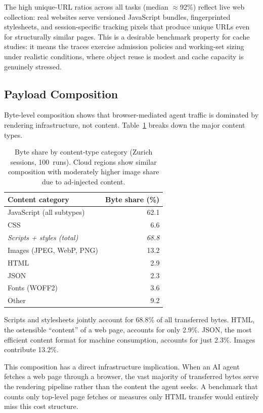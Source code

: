 \documentclass[10pt,sigconf,letterpaper,anonymous,nonacm]{acmart}
\begin{document}
The high unique-URL ratios across all tasks (median $\approx$92\%)
reflect live web collection: real websites serve
versioned JavaScript bundles, fingerprinted stylesheets, and
session-specific tracking pixels that produce unique URLs even for
structurally similar pages.  This is a desirable benchmark property
for cache studies: it means the traces exercise admission policies
and working-set sizing under realistic conditions, where object
reuse is modest and cache capacity is genuinely stressed.


\subsection{Payload Composition}
\label{sec:obs-payload}

Byte-level composition shows that browser-mediated agent traffic is
dominated by rendering infrastructure, not content.  Table~\ref{tab:content} breaks down the major content
types.

\begin{table}[t]
\centering
\small
\caption{Byte share by content-type category (Zurich sessions,
  100~runs).  Cloud regions show similar composition with moderately
  higher image share due to ad-injected content.}
\label{tab:content}
\begin{tabular}{@{}lr@{}}
\toprule
\textbf{Content category} & \textbf{Byte share (\%)} \\
\midrule
JavaScript (all subtypes) & 62.1 \\
CSS                       & 6.6 \\
\textit{Scripts + styles (total)} & \textit{68.8} \\
\midrule
Images (JPEG, WebP, PNG)  & 13.2 \\
HTML                      & 2.9 \\
JSON                      & 2.3 \\
Fonts (WOFF2)             & 3.6 \\
Other                     & 9.2 \\
\bottomrule
\end{tabular}
\end{table}

Scripts and stylesheets jointly account for 68.8\% of all transferred
bytes.  HTML, the ostensible ``content'' of a web page, accounts for
only 2.9\%.  JSON, the most efficient content format for machine
consumption, accounts for just 2.3\%.  Images contribute 13.2\%.

This composition has a direct infrastructure implication.  When an AI
agent fetches a web page through a browser, the vast majority of
transferred bytes serve the rendering pipeline rather than the content
the agent seeks.  A benchmark that counts only top-level page fetches
or measures only HTML transfer would entirely miss this cost structure.
\end{document}
